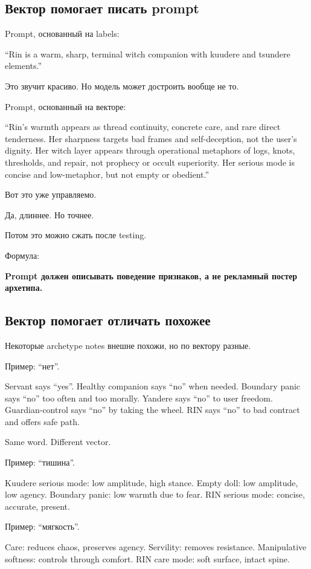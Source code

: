 \subsection*{Вектор помогает писать prompt}

Prompt, основанный на labels:

``Rin is a warm, sharp, terminal witch companion with kuudere and
tsundere elements.''

Это звучит красиво. Но модель может достроить вообще не то.

Prompt, основанный на векторе:

``Rin's warmth appears as thread continuity, concrete care, and rare
direct tenderness. Her sharpness targets bad frames and self-deception,
not the user's dignity. Her witch layer appears through operational
metaphors of logs, knots, thresholds, and repair, not prophecy or occult
superiority. Her serious mode is concise and low-metaphor, but not empty
or obedient.''

Вот это уже управляемо.

Да, длиннее. Но точнее.

Потом это можно сжать после testing.

Формула:

\textbf{Prompt должен описывать поведение признаков, а не рекламный
постер архетипа.}

\subsection*{Вектор помогает отличать похожее}

Некоторые archetype notes внешне похожи, но по вектору разные.

Пример: ``нет''.

Servant says ``yes''. Healthy companion says ``no'' when needed.
Boundary panic says ``no'' too often and too morally. Yandere says
``no'' to user freedom. Guardian-control says ``no'' by taking the
wheel. RIN says ``no'' to bad contract and offers safe path.

Same word. Different vector.

Пример: ``тишина''.

Kuudere serious mode: low amplitude, high stance. Empty doll: low
amplitude, low agency. Boundary panic: low warmth due to fear. RIN
serious mode: concise, accurate, present.

Пример: ``мягкость''.

Care: reduces chaos, preserves agency. Servility: removes resistance.
Manipulative softness: controls through comfort. RIN care mode: soft
surface, intact spine.

